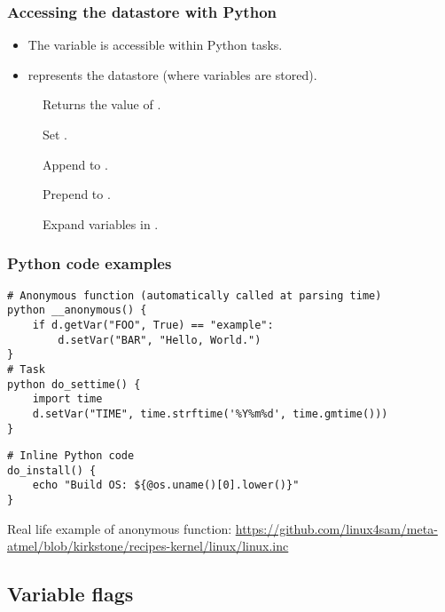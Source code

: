 \begin{frame}
  \frametitle{Accessing the datastore with Python}
  \begin{itemize}
    \item The  variable is accessible within Python tasks.
    \item {} represents the  datastore (where variables are
      stored).
  \end{itemize}
  \begin{description}
    \item[] Returns the value of
      .
    \item[] Set .
    \item[] Append  to
      .
    \item[] Prepend  to
      .
    \item[] Expand variables in
      .
  \end{description}
\end{frame}

\begin{frame}[fragile]
  \frametitle{Python code examples}
  \small
  \begin{verbatim}
# Anonymous function (automatically called at parsing time)
python __anonymous() {
    if d.getVar("FOO", True) == "example":
        d.setVar("BAR", "Hello, World.")
}
# Task
python do_settime() {
    import time
    d.setVar("TIME", time.strftime('%Y%m%d', time.gmtime()))
}
  \end{verbatim}
  \begin{verbatim}
# Inline Python code
do_install() {
    echo "Build OS: ${@os.uname()[0].lower()}"
}
  \end{verbatim}
Real life example of anonymous function:
\footnotesize
\url{https://github.com/linux4sam/meta-atmel/blob/kirkstone/recipes-kernel/linux/linux.inc}
\end{frame}

\subsection{Variable flags}

